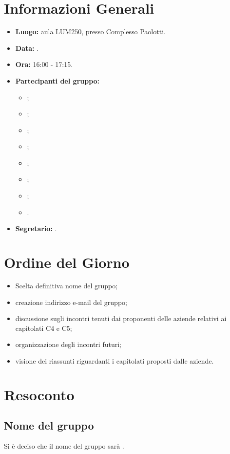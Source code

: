 \section{Informazioni Generali}
\begin{itemize}
\item \textbf{Luogo:} aula LUM250, presso Complesso Paolotti.
\item \textbf{Data:} \Data.
\item \textbf{Ora:} 16:00 - 17:15.
\item \textbf{Partecipanti del gruppo:}
	\begin{itemize}
		\item \AT{}; 
		\item \BR{};
		\item \CE{}; 
		\item \DF{};
		\item \LD{};
		\item \MC{};
		\item \PF{};
		\item \SE{}.
	\end{itemize} 
\item \textbf{Segretario:} \BR{}.
\end{itemize}


\section{Ordine del Giorno}
\begin{itemize}
	\item Scelta definitiva nome del gruppo;
	\item creazione indirizzo e-mail del gruppo;
	\item discussione sugli incontri tenuti dai proponenti delle aziende relativi ai capitolati C4 e C5;
	\item organizzazione degli incontri futuri;
	\item visione dei riassunti riguardanti i capitolati proposti dalle aziende.
\end{itemize}


\section{Resoconto}
\subsection{Nome del gruppo}
Si è deciso che il nome del gruppo sarà \Gruppo{}.

